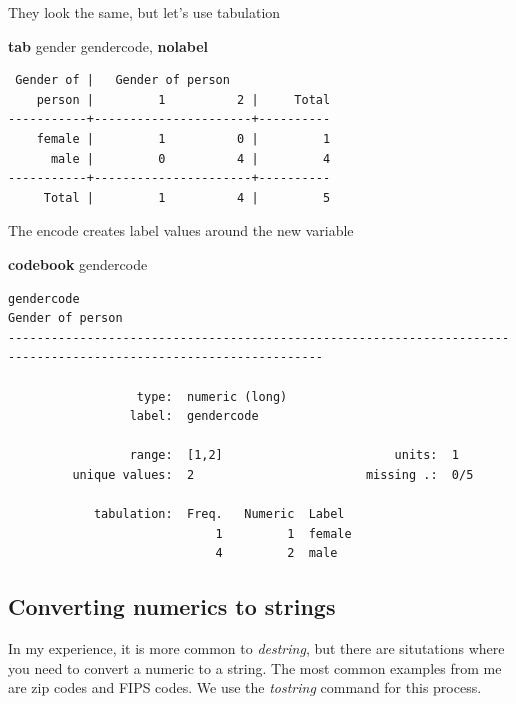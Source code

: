 \documentclass[
]{book}
\newenvironment{Shaded}{\begin{snugshade}}{\end{snugshade}}
\newcommand{\KeywordTok}[1]{\textcolor[rgb]{0.13,0.29,0.53}{\textbf{#1}}}
\newcommand{\NormalTok}[1]{#1}
\begin{document}
They look the same, but let's use tabulation

\begin{Shaded}
\begin{Highlighting}[]
\KeywordTok{tab}\NormalTok{ gender gendercode, }\KeywordTok{nolabel}
\end{Highlighting}
\end{Shaded}

\begin{verbatim}
 Gender of |   Gender of person
    person |         1          2 |     Total
-----------+----------------------+----------
    female |         1          0 |         1 
      male |         0          4 |         4 
-----------+----------------------+----------
     Total |         1          4 |         5 
\end{verbatim}

The encode creates label values around the new variable

\begin{Shaded}
\begin{Highlighting}[]
\KeywordTok{codebook}\NormalTok{ gendercode}
\end{Highlighting}
\end{Shaded}

\begin{verbatim}
gendercode                                                                                        Gender of person
------------------------------------------------------------------------------------------------------------------

                  type:  numeric (long)
                 label:  gendercode

                 range:  [1,2]                        units:  1
         unique values:  2                        missing .:  0/5

            tabulation:  Freq.   Numeric  Label
                             1         1  female
                             4         2  male
\end{verbatim}

\subsection{Converting numerics to strings}\label{converting-numerics-to-strings}

In my experience, it is more common to \emph{destring}, but there are situtations where you need to convert a numeric to a string. The most common examples from me are zip codes and FIPS codes. We use the \emph{tostring} command for this process.
\end{document}
